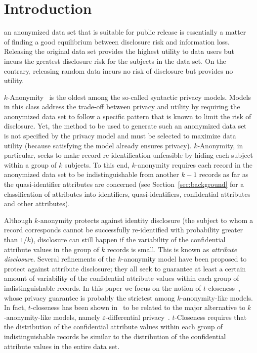 \documentclass[10pt,journal,compsoc]{IEEEtran}
\theoremstyle{definition}
\theoremstyle{plain}
\begin{document}
\maketitle


\IEEEpeerreviewmaketitle



\section{Introduction}
\label{sec1}
 an anonymized data set that is suitable for public
release is essentially a matter of finding a good equilibrium between
disclosure risk and information loss. Releasing the original data
set provides the highest utility to data users but incurs the greatest
disclosure risk for the subjects in the data set. On the contrary,
releasing random data incurs no risk of disclosure but provides
no utility. 

$k$-Anonymity~\cite{Samarati1998Protecting,Sweeney2002kAnonymity}
is the oldest among 
the so-called syntactic privacy models.  
Models in this class address the trade-off between privacy and
utility by requiring the anonymized data set to follow a specific
pattern that is known to limit the risk of disclosure. Yet, the method
to be used to generate such an anonymized data set is not specified by the
privacy model and must be selected to maximize data utility (because
satisfying the model already ensures privacy). $k$-Anonymity,
in particular, seeks to make record re-identification unfeasible by
hiding each subject within a group of $k$ subjects. To this end,
$k$-anonymity requires each record in the anonymized data set to
be indistinguishable from another $k-1$ records as far as the
quasi-identifier attributes are
 concerned (see Section~\ref{sec:background} for a classification
of attributes into identifiers, quasi-identifiers, confidential 
attributes and other attributes).


Although $k$-anonymity protects against identity disclosure (the
subject to whom a record corresponds 
cannot be successfully re-identified with probability
greater than $1/k$), disclosure can still happen if the variability
of the confidential attribute values 
in the group of $k$ records is small. This
is known as \emph{attribute disclosure}. Several refinements of the
$k$-anonymity model have been proposed to protect against attribute
disclosure;
they all seek to
guarantee at least a certain amount of variability of
the confidential attribute values
within each group of indistinguishable records. In this paper we focus
on the notion of $t$-closeness~\cite{Li2007t-Closeness}, whose
privacy guarantee is probably the strictest
among $k$-anonymity-like models. In fact,
$t$-closeness has been
shown in~\cite{Soria2013differential,DomingoSoria15} to be related
to the major alternative
to $k$-anonymity-like models, namely $\varepsilon$-differential 
privacy~\cite{Dwork06}.
$t$-Closeness requires that the distribution
of the confidential attribute values 
within each group of indistinguishable records be
similar to the distribution of the confidential 
attribute values in the entire data set.
\end{document}
